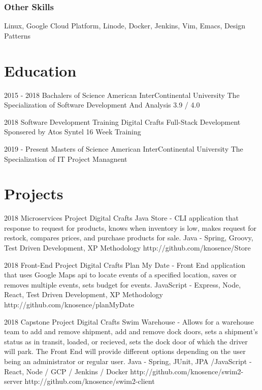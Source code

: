 \documentclass{article}
\begin{document}
\subsubsection{Other Skills}
Linux, Google Cloud Platform, Linode, Docker, Jenkins, Vim, Emacs, Design Patterns

\section{Education}
2015 - 2018 Bachalers of Science
American InterContinental University
The Specialization of Software Development And Analysis
3.9 / 4.0

2018 Software Development Training
Digital Crafts
Full-Stack Development Sponsered by Atos Syntel
16 Week Training

2019 - Present Masters of Science
American InterContinental University
The Specialization of IT Project Managnent


\section{Projects}
2018 Microservices Project
Digital Crafts
Java Store - CLI application that response to request for products, knows when inventory is low, makes request for
restock, compares prices, and purchase products for sale.
Java - Spring, Groovy, Test Driven Development, XP Methodology
http://github.com/knosence/Store


2018 Front-End Project
Digital Crafts
Plan My Date - Front End application that uses Google Maps api to locate events
of a specified location, saves or removes multiple events, sets budget for
events.
JavaScript - Express, Node, React, Test Driven Development, XP Methodology
http://github.com/knosence/planMyDate

2018 Capstone Project
Digital Crafts
Swim Warehouse - Allows for a warehouse team to add and remove shipment, add and
remove dock doors, sets a shipment's status as in transit, loaded, or recieved,
sets the dock door of which the driver will park. The Front End will provide
different options depending on the user being an administrator or regular user.
Java - Spring, JUnit, JPA /JavaScript - React, Node / GCP / Jenkins / Docker
http://github.com/knosence/swim2-server
http://github.com/knosence/swim2-client
\end{document}
